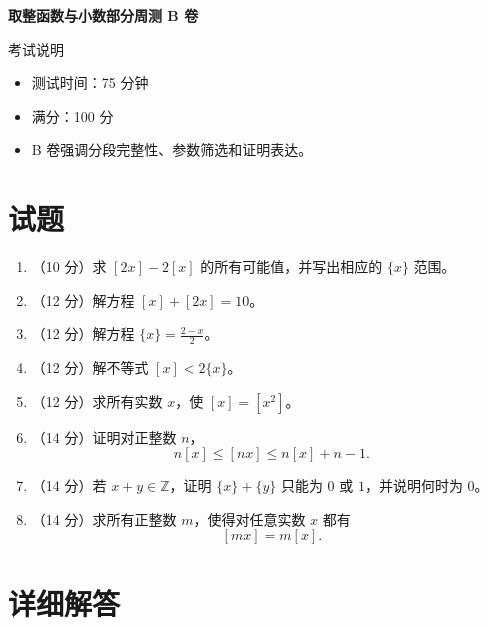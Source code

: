 \documentclass[11pt,a4paper,fontset=fandol]{ctexart}
\begin{document}
\thispagestyle{empty}
\begin{center}{\fontsize{22}{28}\selectfont\bfseries 取整函数与小数部分周测 B 卷\par}\vspace{0.35cm}{\large 初中数学联赛专题提高检测\par}\end{center}
\begin{infobox}{考试说明}
\begin{itemize}\item 测试时间：75 分钟\item 满分：100 分\item B 卷强调分段完整性、参数筛选和证明表达。\end{itemize}
\end{infobox}
\section{试题}
\begin{enumerate}
\item（10 分）求 $[2x]-2[x]$ 的所有可能值，并写出相应的 $\{x\}$ 范围。\answerspace
\item（12 分）解方程 $[x]+[2x]=10$。\answerspace
\item（12 分）解方程 $\{x\}=\frac{2-x}{2}$。\answerspace
\item（12 分）解不等式 $[x]<2\{x\}$。\answerspace
\item（12 分）求所有实数 $x$，使 $[x]=[x^2]$。\biganswerspace
\item（14 分）证明对正整数 $n$，
\[
n[x]\le[nx]\le n[x]+n-1.
\]\biganswerspace
\item（14 分）若 $x+y\in\mathbb Z$，证明 $\{x\}+\{y\}$ 只能为 $0$ 或 $1$，并说明何时为 $0$。\biganswerspace
\item（14 分）求所有正整数 $m$，使得对任意实数 $x$ 都有
\[
[mx]=m[x].
\]\biganswerspace
\end{enumerate}
\newpage\section{详细解答}
\end{document}
